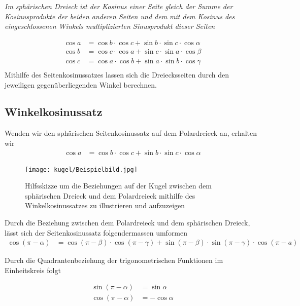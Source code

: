 \begin{refsection}
\begin{satz}\textit{Im sphärischen Dreieck ist der Kosinus einer Seite gleich der Summe der Kosinusprodukte der beiden anderen Seiten und dem mit dem Kosinus des eingeschlossenen Winkels multiplizierten Sinusprodukt dieser Seiten}
\label{skript:kugel:satz:Seitenkosinussatz}
\end{satz}
\begin{align*}
{\cos a} &= {\cos b} \cdot {\cos c} + {\sin b} \cdot {\sin c} \cdot {\cos \alpha}\\
{\cos b} &= {\cos c} \cdot {\cos a} + {\sin c} \cdot {\sin a} \cdot {\cos \beta}\\
{\cos c} &= {\cos a} \cdot {\cos b} + {\sin a} \cdot {\sin b} \cdot {\cos \gamma}\\
\end{align*}
Mithilfe des Seitenkosinussatzes lassen sich die Dreiecksseiten durch den jeweiligen gegenüberliegenden Winkel berechnen.


\subsection{Winkelkosinussatz}

Wenden wir den sphärischen Seitenkosinussatz auf dem Polardreieck an, erhalten wir
\begin{align*}
{\cos a} &= {\cos b} \cdot {\cos c} + {\sin b} \cdot {\sin c} \cdot {\cos \alpha}
\end{align*}

\begin{figure}[htbp]
\centering
\texttt{[image: kugel/Beispielbild.jpg]}
\caption{Hilfsskizze um die Beziehungen auf der Kugel zwischen dem sphärischen Dreieck und dem Polardreieck mithilfe des Winkelkosinussatzes zu illustrieren und aufzuzeigen}
\end{figure}



Durch die Beziehung zwischen dem Polardreieck und dem sphärischen Dreieck, lässt sich der Seitenkosinussatz folgendermassen umformen
\begin{align*}
{\cos (\pi-\alpha)} &= {\cos (\pi-\beta)} \cdot {\cos (\pi-\gamma)} + {\sin(\pi-\beta)} \cdot {\sin(\pi-\gamma)} \cdot {\cos (\pi-a)}
\end{align*}

Durch die Quadrantenbeziehung der trigonometrischen Funktionen im Einheitskreis folgt

\begin{align*}
\sin (\pi-\alpha) &= \sin \alpha\\
\cos (\pi-\alpha) &= - \cos \alpha\\
\end{align*}


\end{refsection}
